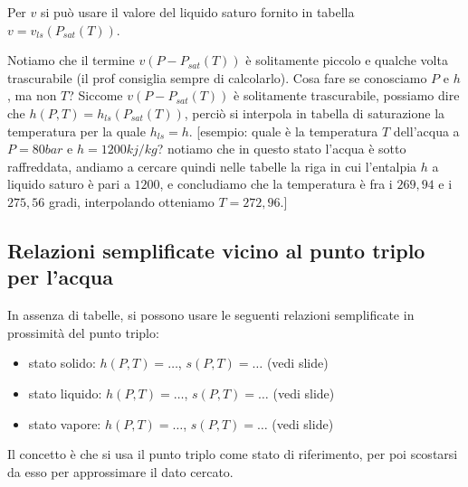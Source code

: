 Per $v$ si può usare il valore del liquido saturo fornito in tabella $v = v_{ls}(P_{sat}(T))$.

Notiamo che il termine $v (P-P_{sat}(T))$ è solitamente piccolo e qualche volta trascurabile (il prof consiglia sempre di calcolarlo).
\newline
Cosa fare se conosciamo $P$ e $h$, ma non $T$? Siccome $v (P-P_{sat}(T))$ è solitamente trascurabile, possiamo dire che $h(P,T) = h_{ls} (P_{sat}(T))$, perciò si interpola in tabella di saturazione la temperatura per la quale $h_{ls} = h$.
[esempio: quale è la temperatura $T$ dell'acqua a $P=80bar$ e $h=1200kj/kg$? notiamo che in questo stato l'acqua è sotto raffreddata, andiamo a cercare quindi nelle tabelle la riga in cui l'entalpia $h$ a liquido saturo è pari a $1200$, e concludiamo che la temperatura è fra i $269,94$ e i $275,56$ gradi, interpolando otteniamo $T=272,96$.]

\subsection{Relazioni semplificate vicino al punto triplo per l'acqua}

In assenza di tabelle, si possono usare le seguenti relazioni semplificate in prossimità del punto triplo:
\begin{itemize}
    \item stato solido: $h(P,T) = \dots$, $s(P,T) = \dots$ (vedi slide)
    \item stato liquido: $h(P,T) = \dots$, $s(P,T) = \dots$ (vedi slide)
    \item stato vapore: $h(P,T) = \dots$, $s(P,T) = \dots$ (vedi slide)
\end{itemize}
Il concetto è che si usa il punto triplo come stato di riferimento, per poi scostarsi da esso per approssimare il dato cercato.